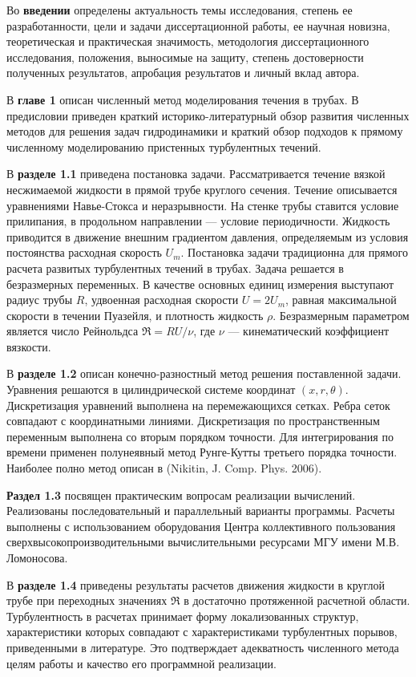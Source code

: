 Во \textbf{введении} определены актуальность темы исследования, степень ее разработанности, цели и задачи диссертационной работы, ее научная новизна, теоретическая и практическая значимость, методология диссертационного исследования, положения, выносимые на защиту, степень достоверности полученных результатов, апробация результатов и личный вклад автора. 

В {\bf главе 1} описан численный метод моделирования течения в трубах. 
В предисловии приведен краткий историко-литературный обзор развития численных методов для решения задач гидродинамики и краткий обзор подходов к прямому численному моделированию пристенных турбулентных течений. 

В \textbf{разделе 1.1} приведена постановка задачи. Рассматривается течение вязкой несжимаемой жидкости в прямой трубе круглого сечения. Течение описывается уравнениями Навье-Стокса и неразрывности. На стенке трубы ставится условие прилипания, в продольном направлении --- условие периодичности. Жидкость приводится в движение внешним градиентом давления, определяемым из условия постоянства расходная скорость $U_m$. Постановка задачи традиционна для прямого расчета развитых турбулентных течений в трубах. Задача решается в безразмерных переменных. В качестве основных единиц измерения выступают радиус трубы $R$, удвоенная расходная скорости $U = 2U_m$, равная максимальной скорости в течении Пуазейля, и плотность жидкость $\rho$. Безразмерным параметром является число Рейнольдса $\Re = RU/\nu$, где $\nu$ --- кинематический коэффициент вязкости.

В \textbf{разделе 1.2} описан конечно-разностный метод решения поставленной задачи. Уравнения решаются в цилиндрической системе координат $(x,r,\theta)$. Дискретизация уравнений выполнена на перемежающихся сетках. %
Ребра сеток совпадают с координатными линиями. Дискретизация по пространственным переменным выполнена со вторым порядком точности. Для интегрирования по времени применен полунеявный метод Рунге-Кутты третьего порядка точности. Наиболее полно метод описан в (Nikitin, J. Comp. Phys. 2006).

\textbf{Раздел 1.3} посвящен практическим вопросам реализации вычислений. Реализованы последовательный и параллельный варианты программы. Расчеты выполнены с использованием оборудования Центра коллективного пользования сверхвысокопроизводительными вычислительными ресурсами МГУ имени М.В.\,Ломоносова. 

В \textbf{разделе 1.4} приведены результаты расчетов движения жидкости в круглой трубе при переходных значениях $\Re$ в достаточно протяженной расчетной области. Турбулентность в расчетах принимает форму локализованных структур, характеристики которых совпадают с характеристиками турбулентных порывов, приведенными в литературе. Это подтверждает адекватность численного метода целям работы и качество его программной реализации. 


